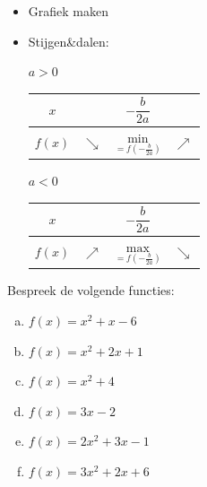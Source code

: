 \documentclass[12pt]{article}
\begin{document}
\begin{mdframed}
\begin{itemize}
  \item Grafiek maken
  \item Stijgen\&dalen:\\
  \begin{minipage}{0.45\textwidth}
    \centering $a>0$\\
    \begin{tabular}{c|lcr}
    $x$ &  & $-\dfrac{b}{2a}$ & \\[0.1cm]
    \hline
    $f(x)$ & $\searrow$ & $\underset{=f(-\frac{b}{2a})}{\mbox{min}}$ & $\nearrow$       
    \end{tabular}
  \end{minipage}
  \begin{minipage}{0.45\textwidth}
    \centering $a<0$\\
    \begin{tabular}{c|lcr}
    $x$ &  & $-\dfrac{b}{2a}$ & \\[0.1cm]
    \hline
    $f(x)$ & $\nearrow$ & $\underset{=f(-\frac{b}{2a})}{\mbox{max}}$ & $\searrow$       
    \end{tabular}
  \end{minipage}
\end{itemize}
\end{mdframed}

\begin{oefening}
Bespreek de volgende functies:
\begin{enumerate}[(a)]
  \item $f(x)=x^2+x-6$
  \item $f(x)=x^2+2x+1$
  \item $f(x)=x^2+4$
  \item $f(x)=3x-2$
  \item $f(x)=2x^2+3x-1$
  \item $f(x)=3x^2+2x+6$
\end{enumerate}
\end{oefening}
\end{document}
